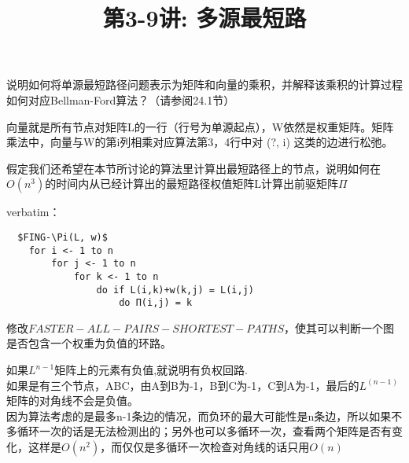 \documentclass[a4paper, justified]{tufte-handout}
\title{第3-9讲: 多源最短路}
\date{\zhtoday} %
\begin{document}
\maketitle
\noplagiarism %
\begin{abstract}
\end{abstract}
\beginrequired

\begin{problem}[TC 25.1-5]
说明如何将单源最短路径问题表示为矩阵和向量的乘积，并解释该乘积的计算过程如何对应Bellman-Ford算法？（请参阅24.1节）
\end{problem}

\begin{solution}
  向量就是所有节点对矩阵L的一行（行号为单源起点），W依然是权重矩阵。矩阵乘法中，向量与W的第i列相乘对应算法第3，4行中对 (?, i) 这类的边进行松弛。
\end{solution}

\begin{problem}[TC 25.1-6]
假定我们还希望在本节所讨论的算法里计算出最短路径上的节点，说明如何在$O(n^3)$的时间内从已经计算出的最短路径权值矩阵L计算出前驱矩阵$\Pi$
\end{problem}

\begin{solution}
  \noindent verbatim：
  \begin{verbatim}
  $FING-\Pi(L, w)$
	for i <- 1 to n
		for j <- 1 to n
			for k <- 1 to n
				do if L(i,k)+w(k,j) = L(i,j)
					do Π(i,j) = k
\end{verbatim}
\end{solution}

\begin{problem}[TC 25.1-9]
修改$FASTER-ALL-PAIRS-SHORTEST-PATHS$，使其可以判断一个图是否包含一个权重为负值的环路。
\end{problem}

\begin{solution}
  如果$L^{n-1}$矩阵上的元素有负值,就说明有负权回路.\\
  如果是有三个节点，ABC，由A到B为-1，B到C为-1，C到A为-1，最后的$L^{(n-1)}$矩阵的对角线不会是负值。\\
  因为算法考虑的是最多n-1条边的情况，而负环的最大可能性是n条边，所以如果不多循环一次的话是无法检测出的；另外也可以多循环一次，查看两个矩阵是否有变化，这样是$O(n^2)$，而仅仅是多循环一次检查对角线的话只用$O(n)$
\end{solution}
\end{document}
